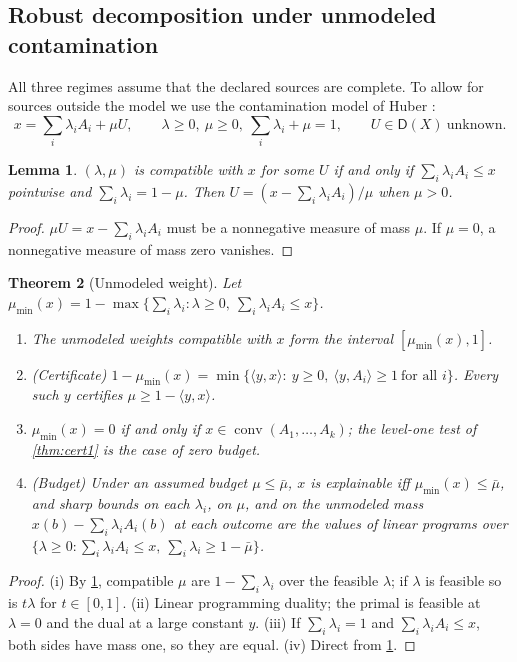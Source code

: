 \documentclass[11pt]{article}
\newtheorem{theorem}{Theorem}[section]
\newtheorem{lemma}[theorem]{Lemma}
\theoremstyle{definition}
\theoremstyle{remark}
\newcommand{\D}{\mathsf{D}}
\begin{document}
\subsection{Robust decomposition under unmodeled contamination}\label{sec:contam}

All three regimes assume that the declared sources are complete. To allow for sources outside the
model we use the contamination model of Huber \cite{Huber1964}:
\[
x=\sum_i\lambda_iA_i+\mu U,\qquad \lambda\ge0,\ \mu\ge0,\ \sum_i\lambda_i+\mu=1,\qquad U\in\D(X)\
\text{unknown}.
\]

\begin{lemma}\label{lem:contam}
$(\lambda,\mu)$ is compatible with $x$ for some $U$ if and only if $\sum_i\lambda_iA_i\le x$ pointwise and
$\sum_i\lambda_i=1-\mu$. Then $U=(x-\sum_i\lambda_iA_i)/\mu$ when $\mu>0$.
\end{lemma}
\begin{proof}
$\mu U=x-\sum_i\lambda_iA_i$ must be a nonnegative measure of mass $\mu$. If $\mu=0$, a nonnegative
measure of mass zero vanishes.
\end{proof}

\begin{theorem}[Unmodeled weight]\label{thm:unmodeled}
Let $\mu_{\min}(x)=1-\max\{\sum_i\lambda_i:\lambda\ge0,\ \sum_i\lambda_iA_i\le x\}$.
\begin{enumerate}[label=(\roman*)]
\item The unmodeled weights compatible with $x$ form the interval $[\mu_{\min}(x),1]$.
\item (Certificate) $1-\mu_{\min}(x)=\min\{\langle y,x\rangle:\ y\ge0,\ \langle y,A_i\rangle\ge1\ \text{for
  all }i\}$. Every such $y$ certifies $\mu\ge1-\langle y,x\rangle$.
\item $\mu_{\min}(x)=0$ if and only if $x\in\operatorname{conv}(A_1,\dots,A_k)$; the level-one test of
  \cref{thm:cert1} is the case of zero budget.
\item (Budget) Under an assumed budget $\mu\le\bar\mu$, $x$ is explainable iff $\mu_{\min}(x)\le\bar\mu$,
  and sharp bounds on each $\lambda_i$, on $\mu$, and on the unmodeled mass
  $x(b)-\sum_i\lambda_iA_i(b)$ at each outcome are the values of linear programs over
  $\{\lambda\ge0:\sum_i\lambda_iA_i\le x,\ \sum_i\lambda_i\ge1-\bar\mu\}$.
\end{enumerate}
\end{theorem}
\begin{proof}
(i) By \cref{lem:contam}, compatible $\mu$ are $1-\sum_i\lambda_i$ over the feasible $\lambda$; if $\lambda$
is feasible so is $t\lambda$ for $t\in[0,1]$. (ii) Linear programming duality; the primal is feasible at
$\lambda=0$ and the dual at a large constant $y$. (iii) If $\sum_i\lambda_i=1$ and
$\sum_i\lambda_iA_i\le x$, both sides have mass one, so they are equal. (iv) Direct from
\cref{lem:contam}.
\end{proof}
\end{document}
